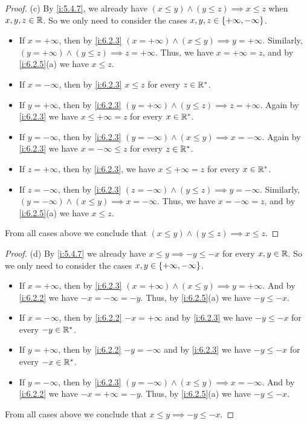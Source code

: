 \begin{proof}{(c)}
  By \cref{i:5.4.7}, we already have \((x \leq y) \land (y \leq z) \implies x \leq z\) when \(x, y, z \in \mathbb{R}\).
  So we only need to consider the cases \(x, y, z \in \left\lbrace+\infty, -\infty\right\rbrace\).
  \begin{itemize}
    \item If \(x = +\infty\), then by \cref{i:6.2.3} \((x = +\infty) \land (x \leq y) \implies y = +\infty\).
          Similarly, \((y = +\infty) \land (y \leq z) \implies z = +\infty\).
          Thus, we have \(x = +\infty = z\), and by \cref{i:6.2.5}(a) we have \(x \leq z\).
    \item If \(x = -\infty\), then by \cref{i:6.2.3} \(x \leq z \) for every \(z \in \mathbb{R}^*\).
    \item If \(y = +\infty\), then by \cref{i:6.2.3} \((y = +\infty) \land (y \leq z) \implies z = +\infty\).
          Again by \cref{i:6.2.3} we have \(x \leq +\infty = z\) for every \(x \in \mathbb{R}^*\).
    \item If \(y = -\infty\), then by \cref{i:6.2.3} \((y = -\infty) \land (x \leq y) \implies x = -\infty\).
          Again by \cref{i:6.2.3} we have \(x = -\infty \leq z\) for every \(z \in \mathbb{R}^*\).
    \item If \(z = +\infty\), then by \cref{i:6.2.3}, we have \(x \leq +\infty = z\) for every \(x \in \mathbb{R}^*\).
    \item If \(z = -\infty\), then by \cref{i:6.2.3} \((z = -\infty) \land (y \leq z) \implies y = -\infty\).
          Similarly, \((y = -\infty) \land (x \leq y) \implies x = -\infty\).
          Thus, we have \(x = -\infty = z\), and by \cref{i:6.2.5}(a) we have \(x \leq z\).
  \end{itemize}
  From all cases above we conclude that \((x \leq y) \land (y \leq z) \implies x \leq z\).
\end{proof}

\begin{proof}{(d)}
  By \cref{i:5.4.7} we already have \(x \leq y \implies -y \leq -x\) for every \(x, y \in \mathbb{R}\).
  So we only need to consider the cases \(x, y \in \left\lbrace+\infty, -\infty\right\rbrace\).
  \begin{itemize}
    \item If \(x = +\infty\), then by \cref{i:6.2.3} \((x = +\infty) \land (x \leq y) \implies y = +\infty\).
          And by \cref{i:6.2.2} we have \(-x = -\infty = -y\).
          Thus, by \cref{i:6.2.5}(a) we have \(-y \leq -x\).
    \item If \(x = -\infty\), then by \cref{i:6.2.2} \(-x = +\infty\) and by \cref{i:6.2.3} we have \(-y \leq -x\) for every \(-y \in \mathbb{R}^*\).
    \item If \(y = +\infty\), then by \cref{i:6.2.2} \(-y = -\infty\) and by \cref{i:6.2.3} we have \(-y \leq -x\) for every \(-x \in \mathbb{R}^*\).
    \item If \(y = -\infty\), then by \cref{i:6.2.3} \((y = -\infty) \land (x \leq y) \implies x = -\infty\).
          And by \cref{i:6.2.2} we have \(-x = +\infty = -y\).
          Thus, by \cref{i:6.2.5}(a) we have \(-y \leq -x\).
  \end{itemize}
  From all cases above we conclude that \(x \leq y \implies -y \leq -x\).
\end{proof}

